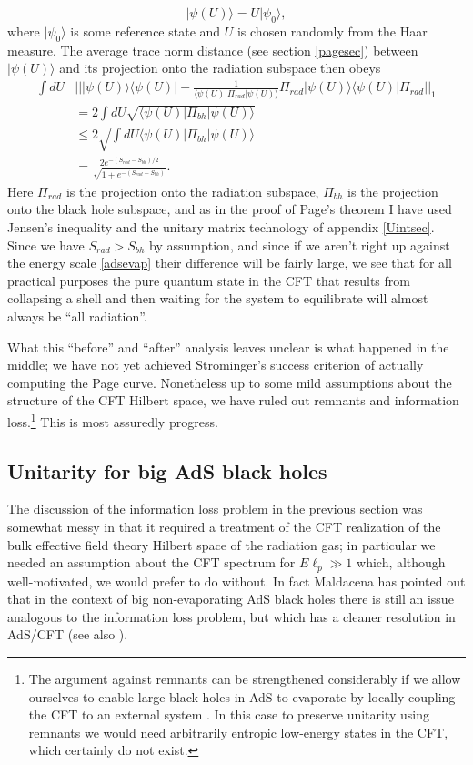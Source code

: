 \documentclass[12pt]{article}
\newcommand{\be}{\begin{equation}}
\newcommand{\ee}{\end{equation}}
\newcommand{\lan}{\langle}
\newcommand{\ran}{\rangle}
\begin{document}
\be
|\psi(U)\ran=U|\psi_0\ran,
\ee
where $|\psi_0\ran$ is some reference state and $U$ is chosen randomly from the Haar measure.  The average trace norm distance (see section \ref{pagesec}) between $|\psi(U)\ran$ and its projection onto the radiation subspace then obeys
\begin{align}\nonumber
\int dU&\Big|\Big||\psi(U)\ran \lan \psi(U)|-\frac{1}{\lan\psi(U)|\Pi_{rad}|\psi(U)\ran}\Pi_{rad}|\psi(U)\ran \lan \psi(U)|\Pi_{rad}\Big|\Big|_1\\\nonumber
&=2\int dU \sqrt{\lan \psi(U)|\Pi_{bh}|\psi(U)\ran}\\\nonumber
&\leq 2 \sqrt{\int dU \lan \psi(U)|\Pi_{bh}|\psi(U)\ran}\\
&=\frac{2e^{-(S_{rad}-S_{bh})/2}}{\sqrt{1+e^{-(S_{rad}-S_{bh})}}}.
\end{align}
Here $\Pi_{rad}$ is the projection onto the radiation subspace, $\Pi_{bh}$ is the projection onto the black hole subspace, and as in the proof of Page's theorem I have used Jensen's inequality and the unitary matrix technology of appendix \ref{Uintsec}.  Since we have $S_{rad}>S_{bh}$ by assumption, and since if we aren't right up against the energy scale \eqref{adsevap} their difference will be fairly large, we see that for all practical purposes the pure quantum state in the CFT that results from collapsing a shell and then waiting for the system to equilibrate will almost always be ``all radiation''.  

What this ``before'' and ``after'' analysis leaves unclear is what happened in the middle; we have not yet achieved Strominger's success criterion of actually computing the Page curve.  Nonetheless up to some mild assumptions about the structure of the CFT Hilbert space, we have ruled out remnants and information loss.\footnote{The argument against remnants can be strengthened considerably if we allow ourselves to enable large black holes in AdS to evaporate by locally coupling the CFT to an external system \cite{Rocha:2008fe}.  In this case to preserve unitarity using remnants we would need arbitrarily entropic low-energy states in the CFT, which certainly do not exist.}  This is most assuredly progress.

\subsection{Unitarity for big AdS black holes}\label{bigUsec}
The discussion of the information loss problem in the previous section was somewhat messy in that it required a treatment of the CFT realization of the bulk effective field theory Hilbert space of the radiation gas; in particular we needed an assumption about the CFT spectrum for $E\ell_p\gg 1$ which, although well-motivated, we would prefer to do without.  In fact Maldacena has pointed out that in the context of big non-evaporating AdS black holes there is still an issue analogous to the information loss problem, but which has a cleaner resolution in AdS/CFT \cite{Maldacena:2001kr} (see also \cite{Barbon:2003aq,Barbon:2014rma}).
\end{document}
